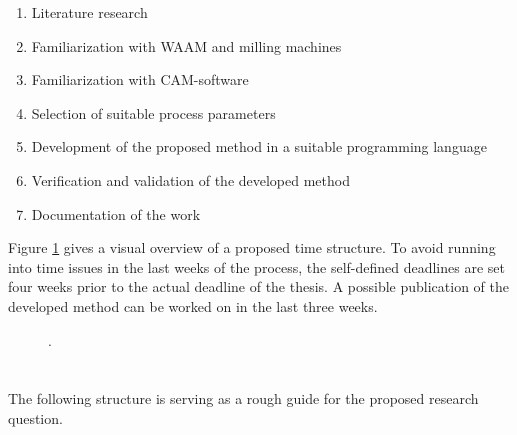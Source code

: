 \documentclass[ZLstudentexpose%
              ,optBiber%
              ,optEnglish%
              ,10pt
              ]{ZLlatex}%
\begin{document}
\begin{enumerate}
\itemsep0em 
\item Literature research
\item Familiarization with WAAM and milling machines 
\item Familiarization with CAM-software 
\item Selection of suitable process parameters
\item Development of the proposed method in a suitable programming language
\item Verification and validation of the developed method
\item Documentation of the work
\end{enumerate}
Figure \ref{TIME} gives a visual overview of a proposed time structure. 
To avoid running into time issues in the last weeks of the process, the self-defined deadlines are set four weeks prior to the actual deadline of the thesis. A possible publication of the developed method can be worked on in the last three weeks.
 
\begin{figure}[H]%
    \centering%
    \ZLlangGerEng{}{}%
    \caption{.}%
    \label{TIME}
\end{figure}%

\newpage
\section{}%

{%
    \printbibliography[heading=none]%
}%
\newpage
\section{}%
The following structure is serving as a rough guide for the proposed research question.
\end{document}
